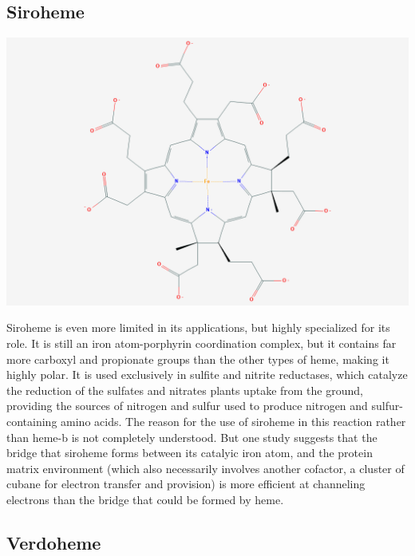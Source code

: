 \documentclass[a4paper, nobind]{templates/ociamthesis}
\let\origfigure\figure
\let\endorigfigure\endfigure
\renewenvironment{figure}[1][2] {
    \expandafter\origfigure\expandafter[H]
} {
    \endorigfigure
}
\begin{document}
\hypertarget{siroheme}{%
\subsection{Siroheme}\label{siroheme}}

\begin{figure}

{\centering \includegraphics[width=0.5\linewidth]{figures/SRM} 

}

\caption{Siroheme (SRM)}\label{fig:structSRM}
\end{figure}

Siroheme is even more limited in its applications, but highly specialized for its role. It is still an iron atom-porphyrin coordination complex, but it contains far more carboxyl and propionate groups than the other types of heme, making it highly polar. It is used exclusively in sulfite and nitrite reductases, which catalyze the reduction of the sulfates and nitrates plants uptake from the ground, providing the sources of nitrogen and sulfur used to produce nitrogen and sulfur-containing amino acids\autocite{Tripathy2010}. The reason for the use of siroheme in this reaction rather than heme-b is not completely understood. But one study suggests that the bridge that siroheme forms between its catalyic iron atom, and the protein matrix environment (which also necessarily involves another cofactor, a cluster of cubane for electron transfer and provision) is more efficient at channeling electrons than the bridge that could be formed by heme.\autocite{Branzanic2019}

\hypertarget{verdoheme}{%
\subsection{Verdoheme}\label{verdoheme}}
\end{document}
